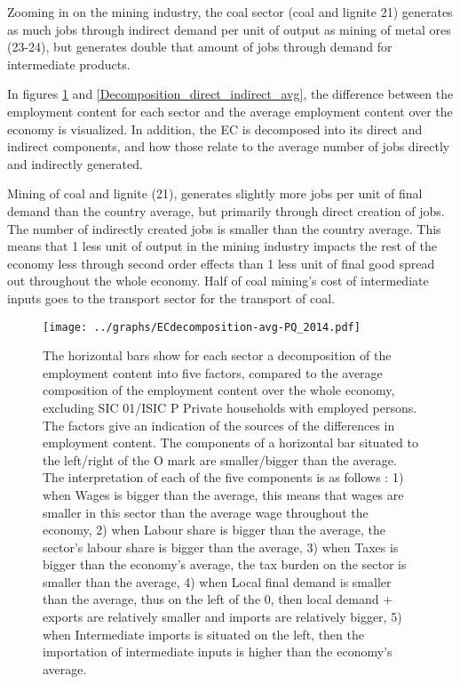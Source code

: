\documentclass[12pt,english]{article}
\begin{document}
Zooming in on the mining industry, the coal sector (coal and lignite 21) generates as much jobs through indirect demand per unit of output as mining of metal ores (23-24), but generates double that amount of jobs through demand for intermediate products. 

In figures \ref{Decomposition_PQ} and \ref{Decomposition_direct_indirect_avg}, the difference between the employment content for each sector and the average employment content over the economy is visualized. In addition, the EC is decomposed into its direct and indirect components, and how those relate to the average number of jobs directly and indirectly generated. 

Mining of coal and lignite (21), generates slightly more jobs per unit of final demand than the country average, but primarily through direct creation of jobs. The number of indirectly created jobs is smaller than the country average. This means that 1 less unit of output in the mining industry impacts the rest of the economy less through second order effects than 1 less unit of final good spread out throughout the whole economy. %
Half of coal mining's cost of intermediate inputs goes to the transport sector for the transport of coal. 


\begin{figure}[!ht]
	\centering
	\texttt{[image: ../graphs/ECdecomposition-avg-PQ\_2014.pdf]}
	\caption{\footnotesize \label{Decomposition_PQ}The horizontal bars show for each sector a decomposition of the employment content into five factors, compared to the average composition of the employment content over the whole economy, excluding SIC 01/ISIC P Private households with employed persons. The factors give an indication of the sources of the differences in employment content. The components of a horizontal bar situated to the left/right of the O mark are smaller/bigger than the average. The interpretation of each of the five components is as follows : 1) when Wages is bigger than the average, this means that wages are smaller in this sector than the average wage throughout the economy, 2) when Labour share is bigger than the average, the sector's labour share is bigger than the average, 3) when Taxes is bigger than the economy's average, the tax burden on the sector is smaller than the average, 4) when Local final demand is smaller than the average, thus on the left of the 0, then local demand + exports are relatively smaller and imports are relatively bigger, 5) when Intermediate imports is situated on the left, then the importation of intermediate inputs is higher than the economy's average.}
\end{figure}	
\end{document}
